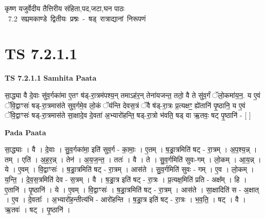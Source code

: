 \documentclass[17pt]{extarticle}
\begin{document}
\begin{titlepage}
    \begin{center}
 
\begin{sanskrit}
    { \Huge
    कृष्ण यजुर्वेदीय तैत्तिरीय संहिता,पद,जटा,घन पाठः 
    }
    \\
    \vspace{2.5cm}
    \mbox{ \Huge
    7.2      सप्तमकाण्डे द्वितीयः प्रश्नः - षड् रात्राद्यानां निरूपणं   }
\end{sanskrit}
\end{center}

\end{titlepage}
\tableofcontents
\pagebreak

\section*{ TS 7.2.1.1 }

\textbf{TS 7.2.1.1 } \newline
\textbf{Samhita Paata} \newline

सा॒द्ध्या वै दे॒वाः सु॑व॒र्गका॑मा ए॒तꣳ ष॑ड्-रा॒त्रम॑पश्य॒न् तमाऽह॑र॒न् तेना॑यजन्त॒ ततो॒ वै ते सु॑व॒र्गं ॅलो॒कमा॑य॒न॒. य ए॒वं ॅवि॒द्वाꣳसः॑ षड्-रा॒त्रमास॑ते सुव॒र्गमे॒व लो॒कं ॅय॑न्ति देवस॒त्रं ॅवै ष॑ड्-रा॒त्रः प्र॒त्यक्षꣳ॒॒ ह्ये॑तानि॑ पृ॒ष्ठानि॒ य ए॒वं ॅवि॒द्वाꣳसः॑ षड्-रा॒त्रमास॑ते सा॒क्षादे॒व दे॒वता॑ अ॒भ्यारो॑हन्ति॒ षड्-रा॒त्रो भ॑वति॒ षड् वा ऋ॒तवः॒ षट् पृ॒ष्ठानि॑ - [  ] \newline

\textbf{Pada Paata} \newline

सा॒द्ध्याः । वै । दे॒वाः । सु॒व॒र्गका॑मा॒ इति॑ सुव॒र्ग - का॒माः॒ । ए॒तम् । ष॒ड्रा॒त्रमिति॑ षट् - रा॒त्रम् । अ॒प॒श्य॒न्न् । तम् । एति॑ । अ॒ह॒र॒न्न् । तेन॑ । अ॒य॒ज॒न्त॒ । ततः॑ । वै । ते । सु॒व॒र्गमिति॑ सुवः-गम् । लो॒कम् । आ॒य॒न्न् । ये । ए॒वम् । वि॒द्वाꣳसः॑ । ष॒ड्रा॒त्रमिति॑ षट् - रा॒त्रम् । आस॑ते । सु॒व॒र्गमिति॑ सुवः - गम् । ए॒व । लो॒कम् । य॒न्ति॒ । दे॒व॒स॒त्रमिति॑ देव - स॒त्रम् । वै । ष॒ड्रा॒त्र इति॑ षट् - रा॒त्रः । प्र॒त्यक्ष॒मिति॑ प्रति - अक्ष᳚म् । हि । ए॒तानि॑ । पृ॒ष्ठानि॑ । ये । ए॒वम् । वि॒द्वाꣳसः॑ । ष॒ड्रा॒त्रमिति॑ षट् - रा॒त्रम् । आस॑ते । सा॒क्षादिति॑ स - अ॒क्षात् । ए॒व । दे॒वताः᳚ । अ॒भ्यारो॑ह॒न्तीत्य॑भि - आरो॑हन्ति । ष॒ड्रा॒त्र इति॑ षट् - रा॒त्रः । भ॒व॒ति॒ । षट् । वै । ऋ॒तवः॑ । षट् । पृ॒ष्ठानि॑ ।  \newline
\end{document}
